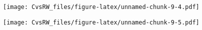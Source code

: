 \documentclass[
]{article}
\newenvironment{Shaded}{\begin{snugshade}}{\end{snugshade}}
\newcommand{\DataTypeTok}[1]{\textcolor[rgb]{0.13,0.29,0.53}{#1}}
\newcommand{\DecValTok}[1]{\textcolor[rgb]{0.00,0.00,0.81}{#1}}
\newcommand{\FloatTok}[1]{\textcolor[rgb]{0.00,0.00,0.81}{#1}}
\newcommand{\KeywordTok}[1]{\textcolor[rgb]{0.13,0.29,0.53}{\textbf{#1}}}
\newcommand{\NormalTok}[1]{#1}
\newcommand{\OperatorTok}[1]{\textcolor[rgb]{0.81,0.36,0.00}{\textbf{#1}}}
\newcommand{\StringTok}[1]{\textcolor[rgb]{0.31,0.60,0.02}{#1}}
\begin{document}
\begin{Shaded}
\end{Shaded}

\texttt{[image: CvsRW\_files/figure-latex/unnamed-chunk-9-4.pdf]}

\begin{Shaded}
\end{Shaded}

\texttt{[image: CvsRW\_files/figure-latex/unnamed-chunk-9-5.pdf]}
\end{document}
